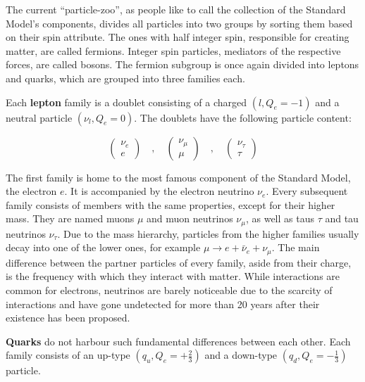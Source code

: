 \noindent The current ``particle-zoo'', as people like to call the collection of the Standard Model's components, divides all particles into two groups by sorting them based on their spin attribute. The ones with half integer spin, responsible for creating matter, are called fermions. Integer spin particles, mediators of the respective forces, are called bosons. The fermion subgroup is once again divided into leptons and quarks, which are grouped into three families each.

Each \textbf{lepton} family is a doublet consisting of a charged $( l, Q_e = -1 )$ and a neutral particle $( \nu_l, Q_e = 0 )$. The doublets have the following particle content:

\begin{equation*}
  \begin{pmatrix}
    \nu_e \\
    e
  \end{pmatrix}
  \quad , \quad
  \begin{pmatrix}
    \nu_\mu \\
    \mu
  \end{pmatrix}
  \quad , \quad
  \begin{pmatrix}
    \nu_\tau \\
    \tau
  \end{pmatrix}
\end{equation*}

The first family is home to the most famous component of the Standard Model, the electron $e$. It is accompanied by the electron neutrino $\nu_e$. Every subsequent family consists of members with the same properties, except for their higher mass. They are named muons $\mu$ and muon neutrinos $\nu_\mu$, as well as taus $\tau$ and tau neutrinos $\nu_\tau$. Due to the mass hierarchy, particles from the higher families usually decay into one of the lower ones, for example $\mu \rightarrow e + \bar{\nu}_e + \nu_\mu$. The main difference between the partner particles of every family, aside from their charge, is the frequency with which they interact with matter. While interactions are common for electrons, neutrinos are barely noticeable due to the scarcity of interactions and have gone undetected for more than 20 years after their existence has been proposed.

\textbf{Quarks} do not harbour such fundamental differences between each other. Each family consists of an up-type $( q_u, Q_e = +\frac{2}{3} )$ and a down-type $( q_d, Q_e = -\frac{1}{3} )$ particle. 

